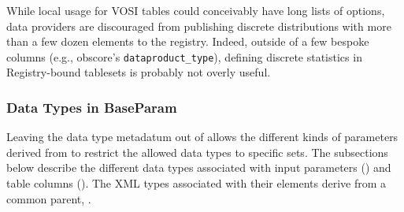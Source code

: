 \documentclass[11pt,a4paper]{ivoa}
\begin{document}
\begin{generated}
\begin{bigdescription}
\end{bigdescription}\endgroup

\endgroup
\end{generated}


While local usage for VOSI tables could conceivably have long lists of
options, data providers are discouraged from publishing discrete
distributions with more than a few dozen elements to the
registry.  Indeed, outside of a few bespoke columns (e.g., obscore's
\verb|dataproduct_type|), defining discrete statistics in Registry-bound
tablesets is probably not overly useful.

\subsubsection{Data Types in BaseParam}

Leaving the data type metadatum out of 
allows the different kinds of parameters derived from
 to restrict the allowed data types to
specific sets.  The subsections below describe the different data
types associated with input parameters
() and table
columns ().  The
XML types associated with their  elements
derive from a common parent, .
\end{document}

